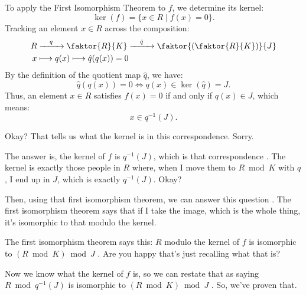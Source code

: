 \begin{content}
To apply the First Isomorphism Theorem to $f$, we determine its kernel:
\[
\ker(f) = \{ x \in R \mid f(x) = 0 \}.
\]
Tracking an element $x \in R$ across the composition:
\begin{equation}\label{eq:kernel-derivation-diagram}
\begin{aligned}
R &\xrightarrow{\quad q \quad} \faktor{R}{K} \xrightarrow{\quad \hat{q} \quad} \faktor{\left(\faktor{R}{K}\right)}{J} \\
x &\longmapsto q(x) \longmapsto \hat{q}(q(x)) = 0
\end{aligned}
\end{equation}
By the definition of the quotient map $\hat{q}$, we have:
\[
\hat{q}(q(x)) = 0 \iff q(x) \in \ker(\hat{q}) = J.
\]
Thus, an element $x \in R$ satisfies $f(x) = 0$ if and only if $q(x) \in J$, which means:
\begin{equation}\label{eq:ker-f-preimage}
x \in q^{-1}(J).
\end{equation}
\end{content}

\begin{speech}[00:06:29 - 00:07:38]
Okay? That tells us what the kernel is in this correspondence. Sorry.

The answer is, the kernel of $f$ is $q^{-1}(J)$, which is that correspondence . The kernel is exactly those people in $R$ where, when I move them to $R \bmod K$ with $q$, I end up in $J$, which is exactly $q^{-1}(J)$. Okay?

Then, using that first isomorphism theorem, we can answer this question . The first isomorphism theorem says that if I take the image, which is the whole thing, it's isomorphic to that modulo the kernel.

The first isomorphism theorem says this: $R$ modulo the kernel of $f$ is isomorphic to $(R \bmod K) \bmod J$ . Are you happy that's just recalling what that is?

Now we know what the kernel of $f$ is, so we can restate that as saying $R \bmod q^{-1}(J)$ is isomorphic to $(R \bmod K) \bmod J$ . So, we've proven that.
\end{speech}

